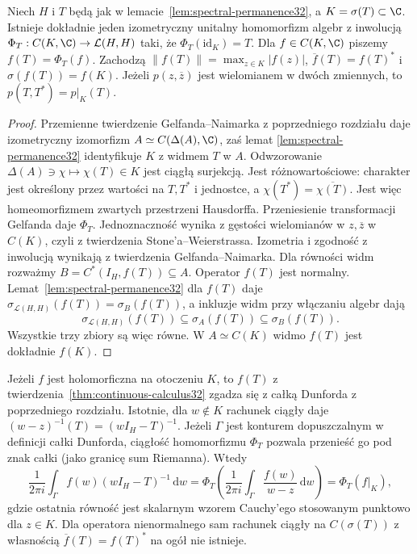 \begin{twierdzenie}
\label{thm:continuous-calculus32}
Niech $H$ i $T$ będą jak w lemacie~\ref{lem:spectral-permanence32},
a $K=\sigma(T)\subset\C$. Istnieje dokładnie jeden izometryczny
unitalny homomorfizm algebr z inwolucją
$\Phi_T:C(K,\C)\to\mathcal L(H,H)$ taki, że
$\Phi_T(\mathrm{id}_K)=T$. Dla $f\in C(K,\C)$ piszemy $f(T)=\Phi_T(f)$.
Zachodzą
$\|f(T)\|=\max_{z\in K}|f(z)|$,
$\overline f(T)=f(T)^*$ i $\sigma(f(T))=f(K)$.
Jeżeli $p(z,\overline z)$ jest wielomianem w dwóch zmiennych,
to $p(T, T^*)=p|_K(T)$.
\end{twierdzenie}
\begin{proof}
Przemienne twierdzenie Gelfanda--Naimarka z
poprzedniego rozdziału daje izometryczny
izomorfizm $A\simeq C(\Delta(A),\C)$, zaś lemat
\ref{lem:spectral-permanence32} identyfikuje $K$ z widmem $T$
w $A$. Odwzorowanie
$\Delta(A)\ni\chi\mapsto\chi(T)\in K$ jest ciągłą surjekcją.
Jest różnowartościowe: charakter jest określony przez wartości
na $T,T^*$ i jednostce, a $\chi(T^*)=\overline{\chi(T)}$.
Jest więc homeomorfizmem zwartych przestrzeni Hausdorffa.
Przeniesienie transformacji Gelfanda daje $\Phi_T$.
Jednoznaczność wynika z gęstości wielomianów w $z,\overline z$
w $C(K)$, czyli z twierdzenia Stone'a--Weierstrassa.
Izometria i zgodność z inwolucją wynikają z twierdzenia
Gelfanda--Naimarka. Dla równości widm rozważmy
$B=C^*(I_H,f(T))\subseteq A$. Operator $f(T)$ jest
normalny. Lemat~\ref{lem:spectral-permanence32} dla
$f(T)$ daje $\sigma_{\mathcal L(H,H)}(f(T))=\sigma_B(f(T))$,
a inkluzje widm przy włączaniu algebr dają
\[
\sigma_{\mathcal L(H,H)}(f(T))\subseteq\sigma_A(f(T))
\subseteq\sigma_B(f(T)).
\]
Wszystkie trzy zbiory są więc równe. W $A\simeq C(K)$
widmo $f(T)$ jest dokładnie $f(K)$.
\end{proof}

\begin{uwaga}
Jeżeli $f$ jest holomorficzna na otoczeniu $K$, to $f(T)$
z twierdzenia~\ref{thm:continuous-calculus32} zgadza się z całką
Dunforda z poprzedniego rozdziału.
Istotnie, dla $w\notin K$ rachunek ciągły daje
$(w-z)^{-1}(T)=(wI_H-T)^{-1}$. Jeżeli $\Gamma$ jest
konturem dopuszczalnym w definicji całki Dunforda,
ciągłość homomorfizmu $\Phi_T$ pozwala przenieść go
pod znak całki (jako granicę sum Riemanna). Wtedy
\[
 \frac1{2\pi i}\int_\Gamma f(w)(wI_H-T)^{-1}\,\mathrm dw
 =\Phi_T\!\left(\frac1{2\pi i}\int_\Gamma
 \frac{f(w)}{w-z}\,\mathrm dw\right)=\Phi_T(f|_K),
\]
gdzie ostatnia równość jest skalarnym wzorem Cauchy'ego
stosowanym punktowo dla $z\in K$.
Dla operatora nienormalnego sam rachunek
ciągły na $C(\sigma(T))$ z własnością $\overline f(T)=f(T)^*$
na ogół nie istnieje.
\end{uwaga}

